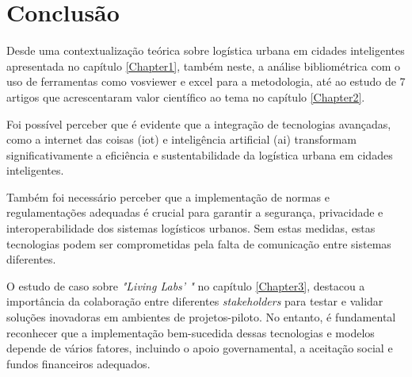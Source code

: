 
\chapter{Conclusão} 	%
\label{Chapter4}         %

Desde uma contextualização teórica sobre logística urbana em cidades inteligentes apresentada no capítulo \ref{Chapter1}, também neste, a análise bibliométrica com o uso de ferramentas como \gls{vosviewer} e \gls{excel} para a metodologia, até ao estudo de 7 artigos que acrescentaram valor científico ao tema no capítulo \ref{Chapter2}.

Foi possível perceber que é evidente que a integração de tecnologias avançadas, como a internet das coisas (\gls{iot}) e inteligência artificial (\gls{ai}) transformam significativamente a eficiência e sustentabilidade da logística urbana em cidades inteligentes.

Também foi necessário perceber que a implementação de normas e regulamentações adequadas é crucial para garantir a segurança, privacidade e interoperabilidade dos sistemas logísticos urbanos. Sem estas medidas, estas tecnologias podem ser comprometidas pela falta de comunicação entre sistemas diferentes.

O estudo de caso sobre \textit{"Living Labs' "} no capítulo \ref{Chapter3},  destacou a importância da colaboração entre diferentes \textit{stakeholders} para testar e validar soluções inovadoras em ambientes de projetos-piloto.
No entanto, é fundamental reconhecer que a implementação bem-sucedida dessas tecnologias e modelos depende de vários fatores, incluindo o apoio governamental, a aceitação social e fundos financeiros adequados.


